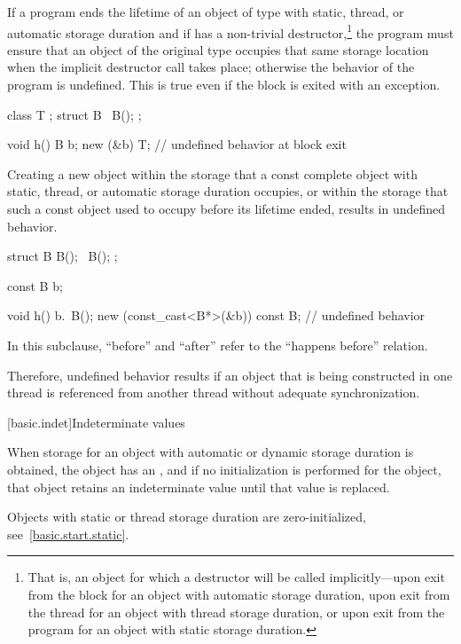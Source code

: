 \pnum
If a program ends the lifetime of an object of type  with
static, thread,
or automatic
storage duration and if  has a non-trivial destructor,\footnote{That
is, an object for which a destructor will be called
implicitly---upon exit from the block for an object with
automatic storage duration, upon exit from the thread for an object with
thread storage duration, or upon exit from the program for an object
with static storage duration.}
the program must ensure that an object of the original type occupies
that same storage location when the implicit destructor call takes
place; otherwise the behavior of the program is undefined. This is true
even if the block is exited with an exception. \begin{example}

\begin{codeblock}
class T { };
struct B {
   ~B();
};

void h() {
   B b;
   new (&b) T;
}                               // undefined behavior at block exit
\end{codeblock}
\end{example}

\pnum
Creating a new object within the storage that a const complete
object with static, thread, or automatic storage duration occupies,
or within the storage that such a const object used to occupy before
its lifetime ended, results in undefined behavior.
\begin{example}
\begin{codeblock}
struct B {
  B();
  ~B();
};

const B b;

void h() {
  b.~B();
  new (const_cast<B*>(&b)) const B;     // undefined behavior
}
\end{codeblock}
\end{example}

\pnum
In this subclause, ``before'' and ``after'' refer to the ``happens before''
relation. \begin{note} Therefore, undefined behavior results
if an object that is being constructed in one thread is referenced from another
thread without adequate synchronization. \end{note}%

[basic.indet]{Indeterminate values}

\pnum
{}%
%
When storage for an object with automatic or dynamic storage duration
is obtained, the object has an , and if
no initialization is performed for the object, that object retains an
indeterminate value until that value is replaced.
\begin{note}
Objects with static or thread storage duration are zero-initialized,
see~\ref{basic.start.static}.
\end{note}

